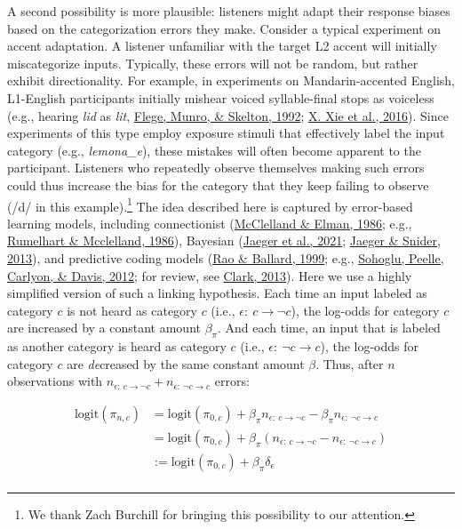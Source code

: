 \documentclass[
  11pt,
  english,
  man,floatsintext]{apa6}
\begin{document}
A second possibility is more plausible: listeners might adapt their response biases based on the categorization errors they make. Consider a typical experiment on accent adaptation. A listener unfamiliar with the target L2 accent will initially miscategorize inputs. Typically, these errors will not be random, but rather exhibit directionality. For example, in experiments on Mandarin-accented English, L1-English participants initially mishear voiced syllable-final stops as voiceless (e.g., hearing \emph{lid} as \emph{lit}, \protect\hyperlink{ref-flege1992}{Flege, Munro, \& Skelton, 1992}; \protect\hyperlink{ref-xie2016jep}{X. Xie et al., 2016}). Since experiments of this type employ exposure stimuli that effectively label the input category (e.g., \emph{lemona\_e}), these mistakes will often become apparent to the participant. Listeners who repeatedly observe themselves making such errors could thus increase the bias for the category that they keep failing to observe (/d/ in this example).\footnote{We thank Zach Burchill for bringing this possibility to our attention.} The idea described here is captured by error-based learning models, including connectionist (\protect\hyperlink{ref-mcclelland-elman1986}{McClelland \& Elman, 1986}; e.g., \protect\hyperlink{ref-rumelhart-mcclelland1986}{Rumelhart \& Mcclelland, 1986}), Bayesian (\protect\hyperlink{ref-jaeger2019}{Jaeger et al., 2021}; \protect\hyperlink{ref-jaeger-snider2013}{Jaeger \& Snider, 2013}), and predictive coding models (\protect\hyperlink{ref-rao-ballard1999}{Rao \& Ballard, 1999}; e.g., \protect\hyperlink{ref-sohoglu2012}{Sohoglu, Peelle, Carlyon, \& Davis, 2012}; for review, see \protect\hyperlink{ref-clark2013}{Clark, 2013}). Here we use a highly simplified version of such a linking hypothesis. Each time an input labeled as category \(c\) is not heard as category \(c\) (i.e., \(\epsilon\mathrm{:}\ c \rightarrow \neg c\)), the log-odds for category \(c\) are increased by a constant amount \(\beta_{\pi}\). And each time, an input that is labeled as another category is heard as category \(c\) (i.e., \(\epsilon\mathrm{:}\ \neg c \rightarrow c\)), the log-odds for category \(c\) are \emph{de}creased by the same constant amount \(\beta\). Thus, after \(n\) observations with \(n_{\epsilon\mathrm{:}\ c \rightarrow \neg c} + n_{\epsilon\mathrm{:}\ \neg c \rightarrow c}\) errors:

\begin{equation}\label{eq:bias-updating}
\begin{split}
\mathrm{logit}(\pi_{n,c}) & = \mathrm{logit}(\pi_{0,c}) + \beta_{\pi} n_{\epsilon\mathrm{:}\ c \rightarrow \neg c} - \beta_{\pi} n_{\epsilon\mathrm{:}\ \neg c \rightarrow c} \\
                          & = \mathrm{logit}(\pi_{0,c}) + \beta_{\pi} (n_{\epsilon\mathrm{:}\ c \rightarrow \neg c} - n_{\epsilon\mathrm{:}\ \neg c \rightarrow c}) \\
                          & := \mathrm{logit}(\pi_{0,c}) + \beta_{\pi} \delta_{\epsilon} \\
\end{split}
\end{equation}
\end{document}
